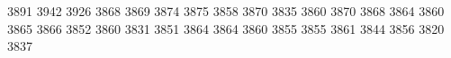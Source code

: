 3891
3942
3926
3868
3869
3874
3875
3858
3870
3835
3860
3870
3868
3864
3860
3865
3866
3852
3860
3831
3851
3864
3864
3860
3855
3855
3861
3844
3856
3820
3837
